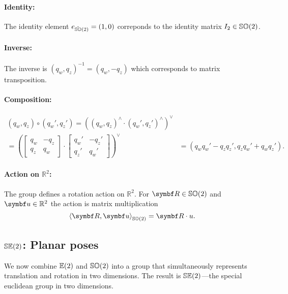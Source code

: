 \paragraph{Identity:} The identity element $e_{\check{\mathbb{SO}}(2)} = (1, 0)$ correponds to the identity matrix $I_2 \in {\mathbb{SO}(2)}$.

\paragraph{Inverse:} The inverse is $(q_w, q_z)^{-1} = (q_w, -q_z)$ which corresponds to matrix transposition.

\paragraph{Composition:}
\begin{equation}
  \begin{aligned}
    (q_w, q_z) \circ (q_w', q_z') = \left( (q_w, q_z)^\wedge \cdot (q_w', q_z')^\wedge \right)^\vee                                    \\
    = \left( \begin{bmatrix}
      q_w & -q_z \\ q_z & q_w
    \end{bmatrix} \cdot \begin{bmatrix}
      q_w' & -q_z' \\ q_z' & q_w'
    \end{bmatrix}  \right)^\vee & = (q_w q_w' - q_z q_z', q_z q_w' + q_w q_z').
  \end{aligned}
\end{equation}

\paragraph{Action on $\mathbb{R}^2$:}
The group defines a rotation action on $\mathbb{R}^2$. For $\bR \in \SOtwo$ and $\bu \in \mathbb{R}^2$ the action is matrix multiplication
\begin{equation}
  \left \langle \bR, \bu \right \rangle_{\SOtwo} = \bR \cdot u.
\end{equation}


\subsection{\texorpdfstring{${\mathbb{SE}(2)}$}{SE(2)}: Planar poses}

We now combine ${\mathbb{E}(2)}$ and ${\mathbb{SO}(2)}$ into a group that simultaneously represents translation and rotation in two dimensions. The result is ${\mathbb{SE}(2)}$---the special euclidean group in two dimensions.

